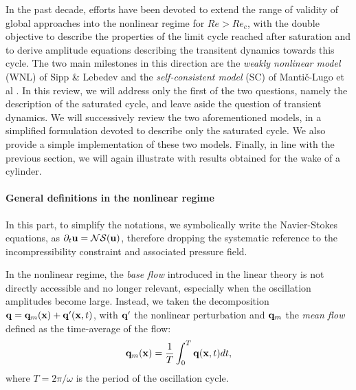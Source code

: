\documentclass[twocolumn,10pt]{asme2ej}
\newcommand{\be}[1]{ \begin{equation} \label{#1}}
\newcommand{\ee}{\end{equation}}
\begin{document}
In the past decade, efforts have been devoted to extend the range of validity of global approaches into the nonlinear regime for $Re>Re_c$, with the double objective to describe the properties of the limit cycle reached after saturation and to derive amplitude equations describing the transitent dynamics towards this cycle. The two main milestones in this direction {\color{red} are} the {\em weakly nonlinear model}  (WNL) of Sipp \& Lebedev \cite{SippLebedev} and the {\em self-consistent model} (SC) of Manti\v{c}-Lugo et al \cite{MLugo2014}.
 {\color{blue} In this review, we will address only the first of the two questions, namely {\color{red} the} description of the saturated cycle, and leave aside the question of transient dynamics. We will successively review the two aforementioned models, in a simplified formulation devoted to describe only the saturated cycle. We also provide a simple implementation of these two models. Finally, in line with the previous section, we will again illustrate with results obtained for the wake of a cylinder.
 }
 
 

\paragraph{General definitions in the nonlinear r{\color{red}e}gime}
 
In this part, to simplify the notations, we symbolically write the Navier-Stokes equations, as {\color{red}$\partial_t {\bf u} = {\cal NS} ({\bf u})$}, therefore dropping the systematic reference to the incompressibility constraint and associated pressure field. 

In the nonlinear r{\color{red}e}gime, the {\em base flow} introduced in the linear theory is not directly accessible and no longer relevant, especially when the oscillation amplitudes become large. 
Instead, {\color{red} we taken the decomposition ${\bf q}={\bf q}_m({\bf x})+{\bf q}'({\bf x},t)$, with ${\bf q}'$ the nonlinear perturbation and ${\bf q}_m$ the {\em mean flow} defined as the time-average  of the flow:}
\be{defumean}
{\bf q}_m({\bf x})  = \frac{1}{T} \int_0^{T}  {\bf q}({\bf x},t)  dt,
\ee
where $T = 2\pi/\omega$  is the period of the oscillation cycle.
\end{document}
